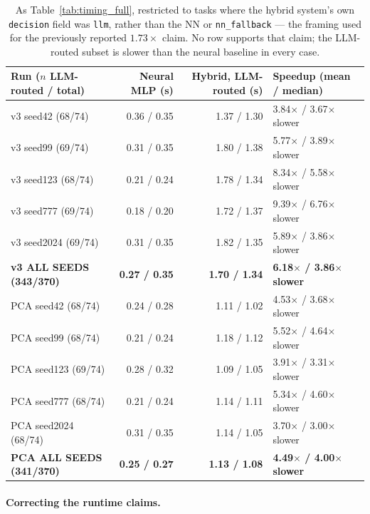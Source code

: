 \documentclass[twoside,11pt]{article}
\begin{document}
\begin{table}[htbp]
\centering
\small
\caption{As Table~\ref{tab:timing_full}, restricted to tasks where the
hybrid system's own \texttt{decision} field was \texttt{llm}, rather than
the NN or \texttt{nn\_fallback} --- the framing used for the previously reported $1.73\times$
claim. No row supports that claim; the LLM-routed subset is slower than
the neural baseline in every case.}
\label{tab:timing_llm_routed_full}
\begin{tabular}{lrrl}
\toprule
Run ($n$ LLM-routed / total) & Neural MLP (s) & Hybrid, LLM-routed (s) & Speedup (mean / median) \\
\midrule
v3 seed42 (68/74) & 0.36 / 0.35 & 1.37 / 1.30 & 3.84$\times$ / 3.67$\times$ slower \\
v3 seed99 (69/74) & 0.31 / 0.35 & 1.80 / 1.38 & 5.77$\times$ / 3.89$\times$ slower \\
v3 seed123 (68/74) & 0.21 / 0.24 & 1.78 / 1.34 & 8.34$\times$ / 5.58$\times$ slower \\
v3 seed777 (69/74) & 0.18 / 0.20 & 1.72 / 1.37 & 9.39$\times$ / 6.76$\times$ slower \\
v3 seed2024 (69/74) & 0.31 / 0.35 & 1.82 / 1.35 & 5.89$\times$ / 3.86$\times$ slower \\
\rowcolor{black!8}
\textbf{v3 ALL SEEDS (343/370)} & \textbf{0.27 / 0.35} & \textbf{1.70 / 1.34} & \textbf{6.18$\times$ / 3.86$\times$ slower} \\
PCA seed42 (68/74) & 0.24 / 0.28 & 1.11 / 1.02 & 4.53$\times$ / 3.68$\times$ slower \\
PCA seed99 (68/74) & 0.21 / 0.24 & 1.18 / 1.12 & 5.52$\times$ / 4.64$\times$ slower \\
PCA seed123 (69/74) & 0.28 / 0.32 & 1.09 / 1.05 & 3.91$\times$ / 3.31$\times$ slower \\
PCA seed777 (68/74) & 0.21 / 0.24 & 1.14 / 1.11 & 5.34$\times$ / 4.60$\times$ slower \\
PCA seed2024 (68/74) & 0.31 / 0.35 & 1.14 / 1.05 & 3.70$\times$ / 3.00$\times$ slower \\
\rowcolor{black!8}
\textbf{PCA ALL SEEDS (341/370)} & \textbf{0.25 / 0.27} & \textbf{1.13 / 1.08} & \textbf{4.49$\times$ / 4.00$\times$ slower} \\
\bottomrule
\end{tabular}
\end{table}

\paragraph{Correcting the runtime claims.}
\label{sec:correction}
\end{document}
